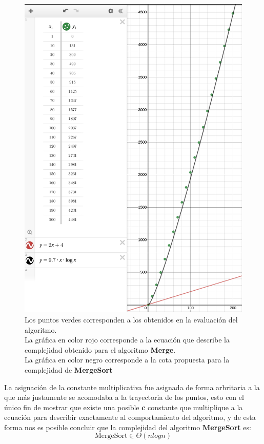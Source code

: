     \begin{figure}[h!]
        \centering
        \includegraphics[width=13cm]{MergeSort/GraficasFinalesMergeSort.png}
        \caption{Los puntos verdes corresponden a los obtenidos en la evaluación del algoritmo.\\ La gráfica en color rojo corresponde a la ecuación que describe la complejidad obtenido para el algoritmo \textbf{Merge}.\\ La gráfica en color negro corresponde a la cota propuesta para la complejidad de \textbf{MergeSort}}
        \label{GraficasFinalesMergeSort}
    \end{figure}
    \newpage
    
    La asignación de la constante multiplicativa fue asignada de forma arbritaria a la que más justamente se acomodaba a la trayectoria de los puntos, esto con el único fin de mostrar que existe una posible \textbf{c} constante que multiplique a la ecuación para describir exactamente al comportamiento del algoritmo, y de esta forma nos es posible concluir que la complejidad del algoritmo \textbf{MergeSort} es:
    \begin{equation*}
        \text{MergeSort} \in \Theta(nlogn)
    \end{equation*}
    
